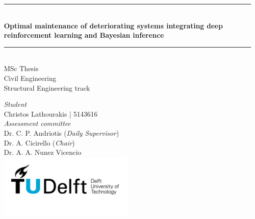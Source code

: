 \begin{titlepage}
    \center
    
    \rule{\textwidth}{1pt}\\[1cm]
    {\huge\bfseries Optimal maintenance of deteriorating systems integrating deep reinforcement learning and Bayesian inference}\\[0.4cm]
    \rule{\textwidth}{1pt}\\[1.5cm]
    
    \large{MSc Thesis}\\
    \large{Civil Engineering}\\
    \large{Structural Engineering track}\\
    
    \vspace{2cm}
    
    \emph{Student}\\[0.2cm]
    \large{Christos Lathourakis | 5143616} \\ 

    \vfill
    \emph{Assessment committee}\\[0.2cm]
    \large
    Dr. C. P. Andriotis (\emph{Daily Supervisor})\\
    Dr. A. Cicirello (\emph{Chair})\\
    Dr. A. A. Nunez Vicencio \\ 
    
    
    \vfill
    \includegraphics[width=0.5\textwidth]{Figures/TU_delft_logo.jpg}\\[1cm]
\end{titlepage}